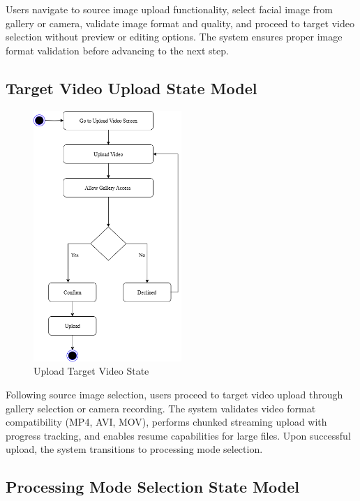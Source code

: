 \documentclass[12pt,a4paper]{report}
\begin{document}
Users navigate to source image upload functionality, select facial image from gallery or camera, validate image format and quality, and proceed to target video selection without preview or editing options. The system ensures proper image format validation before advancing to the next step.

\subsection{Target Video Upload State Model}

\begin{figure}[H]
\centering
\includegraphics[width=0.5\textwidth]{figures/upload_video_state.png}
\caption{Upload Target Video State}
\label{fig:upload_video_state}
\end{figure}

Following source image selection, users proceed to target video upload through gallery selection or camera recording. The system validates video format compatibility (MP4, AVI, MOV), performs chunked streaming upload with progress tracking, and enables resume capabilities for large files. Upon successful upload, the system transitions to processing mode selection.

\subsection{Processing Mode Selection State Model}
\end{document}
